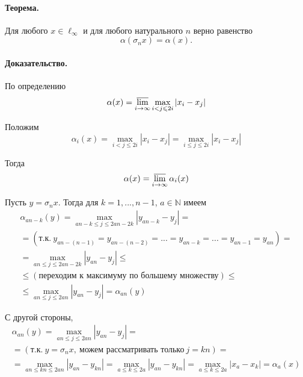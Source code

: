 \paragraph{Теорема.}
Для любого $x\in\ell_\infty$ и для любого натурального $n$ верно равенство
\begin{equation}
	\alpha(\sigma_n x) = \alpha(x)
	.
\end{equation}

\paragraph{Доказательство.}
По определению
\begin{equation}
	\alpha(x) = \varlimsup_{i\to\infty} \max_{i<j\leqslant 2i} |x_i - x_j|
\end{equation}

Положим
\begin{equation}
	\alpha_i(x) =
	\max_{i<j\leqslant 2i} |x_i - x_j| =
	\max_{i\leqslant j\leqslant 2i} |x_i - x_j|
\end{equation}

Тогда
\begin{equation}
	\alpha(x) = \varlimsup_{i\to\infty} \alpha_i(x)
\end{equation}

Пусть $y = \sigma_n x$.
Тогда для $k=1, ..., n-1$, $a\in\mathbb{N}$ имеем
\begin{multline}
	\alpha_{an-k}(y) =
	\max_{an-k \leqslant j \leqslant 2an-2k} |y_{an-k} - y_j| =
	\\=
	(\mbox{т.к.}~y_{an-(n-1)}=y_{an-(n-2)}=...=y_{an-k}=...=y_{an-1}=y_{an})=
	\\=
	\max_{an \leqslant j \leqslant 2an-2k} |y_{an} - y_j| \leqslant
	\\ \leqslant
	(\mbox{переходим к максимуму по большему множеству}) \leqslant
	\\ \leqslant
	\max_{an \leqslant j \leqslant 2an} |y_{an} - y_j| =
	\alpha_{an}(y)
\end{multline}

С другой стороны,
\begin{multline}
	\alpha_{an}(y) =
	\max_{an \leqslant j \leqslant 2an} |y_{an} - y_j| =
	\\ =
	(\mbox{т.к.}~y=\sigma_n x,~\mbox{можем рассматривать только}~j=kn)=
	\\ =
	\max_{an \leqslant kn \leqslant 2an} |y_{an} - y_{kn}| =
	\max_{a \leqslant k \leqslant 2a} |y_{an} - y_{kn}| =
	\max_{a \leqslant k \leqslant 2a} |x_a - x_k| =
	\alpha_a(x)
\end{multline}

